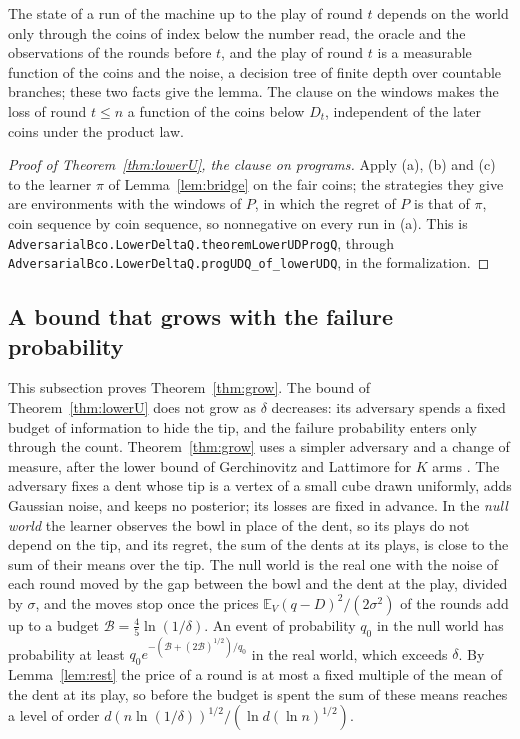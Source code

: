 \documentclass[11pt]{amsart}
\theoremstyle{definition}
\numberwithin{equation}{section}
\newcommand{\E}{\mathbb{E}}
\begin{document}
The state of a run of the machine up to the play of round $t$ depends on the world only through the coins of index below the number read, the oracle and the observations of the rounds before $t$, and the play of round $t$ is a measurable function of the coins and the noise, a decision tree of finite depth over countable branches; these two facts give the lemma. The clause on the windows makes the loss of round $t\le n$ a function of the coins below $D_t$, independent of the later coins under the product law.

\begin{proof}[Proof of Theorem~\ref{thm:lowerU}, the clause on programs]
Apply (a), (b) and (c) to the learner $\pi$ of Lemma~\ref{lem:bridge} on the fair coins; the strategies they give are environments with the windows of $P$, in which the regret of $P$ is that of $\pi$, coin sequence by coin sequence, so nonnegative on every run in (a).
This is \texttt{AdversarialBco.LowerDeltaQ.theoremLowerUDProgQ}, through \texttt{AdversarialBco.\allowbreak LowerDeltaQ.\allowbreak progUDQ\_of\_lowerUDQ}, in the formalization.
\end{proof}

\subsection{A bound that grows with the failure probability}\label{sec:lower-grow}

This subsection proves Theorem~\ref{thm:grow}. The bound of Theorem~\ref{thm:lowerU} does not grow as $\delta$ decreases: its adversary spends a fixed budget of information to hide the tip, and the failure probability enters only through the count. Theorem~\ref{thm:grow} uses a simpler adversary and a change of measure, after the lower bound of Gerchinovitz and Lattimore for $K$ arms \cite[Theorem~1]{GL16}. The adversary fixes a dent whose tip is a vertex of a small cube drawn uniformly, adds Gaussian noise, and keeps no posterior; its losses are fixed in advance. In the \emph{null world} the learner observes the bowl in place of the dent, so its plays do not depend on the tip, and its regret, the sum of the dents at its plays, is close to the sum of their means over the tip. The null world is the real one with the noise of each round moved by the gap between the bowl and the dent at the play, divided by $\sigma$, and the moves stop once the prices $\E_V(q-D)^2/(2\sigma^2)$ of the rounds add up to a budget $\mathcal B=\frac45\ln(1/\delta)$. An event of probability $q_0$ in the null world has probability at least $q_0e^{-(\mathcal B+(2\mathcal B)^{1/2})/q_0}$ in the real world, which exceeds $\delta$. By Lemma~\ref{lem:rest} the price of a round is at most a fixed multiple of the mean of the dent at its play, so before the budget is spent the sum of these means reaches a level of order $d(n\ln(1/\delta))^{1/2}/(\ln d(\ln n)^{1/2})$.
\end{document}

